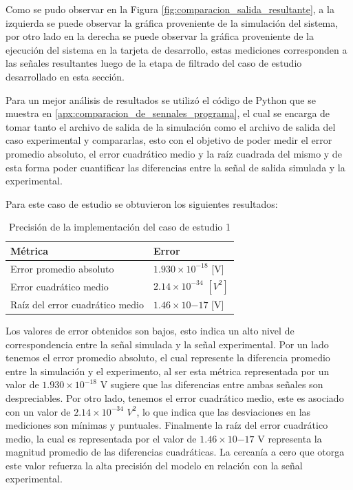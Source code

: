Como se pudo observar en la Figura \ref{fig:comparacion_salida_resultante}, a la izquierda se puede observar la gráfica proveniente de la simulación del sistema, por otro lado en la derecha se puede observar la gráfica proveniente de la ejecución del sistema en la tarjeta de desarrollo, estas mediciones corresponden a las señales resultantes luego de la etapa de filtrado del caso de estudio desarrollado en esta sección. 

Para un mejor análisis de resultados se utilizó el código de Python que se muestra en \ref{apx:comparacion_de_sennales_programa}, el cual se encarga de tomar tanto el archivo de salida de la simulación como el archivo de salida del caso experimental y compararlas, esto con el objetivo de poder medir el error promedio absoluto, el error cuadrático medio y la raíz cuadrada del mismo y de esta forma poder cuantificar las diferencias entre la señal de salida simulada y la experimental.

Para este caso de estudio se obtuvieron los siguientes resultados:

\begin{table}[htbp!]
    \centering
    \caption{Precisión de la implementación del caso de estudio 1}
    \label{tab:filter-error}
    \begin{tabular}{ll}
    Métrica                       & Error \\ \hline
    Error promedio absoluto         &   $1.930 \times 10^{-18}$ [V]    \\
    Error cuadrático medio          &   $2.14 \times 10^{-34}$ $[V^{2}]$    \\
    Raíz del error cuadrático medio &   $1.46 \times 10{-17}$ [V]  
    \end{tabular}
    \end{table}


Los valores de error obtenidos son bajos, esto indica un alto nivel de correspondencia entre la señal simulada y la señal experimental. Por un lado tenemos el error promedio absoluto, el cual represente la diferencia promedio entre la simulación y el experimento, al ser esta métrica representada por un valor de $1.930 \times 10^{-18}$ V sugiere que las diferencias entre ambas señales son despreciables. Por otro lado, tenemos el error cuadrático medio, este es asociado con un valor de $2.14 \times 10^{-34}$ $V^{2}$, lo que indica que las desviaciones en las mediciones son mínimas y puntuales. Finalmente la raíz del error cuadrático medio, la cual es representada por el valor de $1.46 \times 10{-17}$ V representa la magnitud promedio de las diferencias cuadráticas. La cercanía a cero que otorga este valor refuerza la alta precisión del modelo en relación con la señal experimental.


